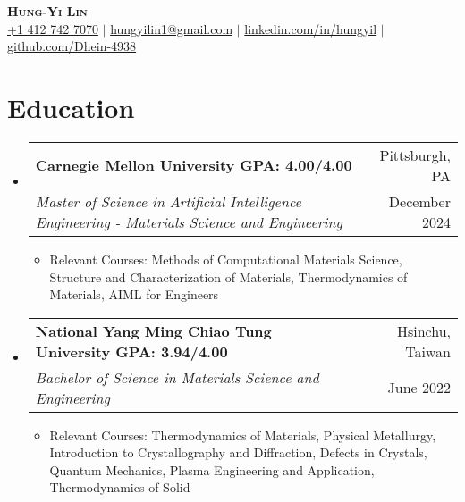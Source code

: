 \documentclass[a4paper,11pt]{article}
\makeatletter
\newcommand{\resumeItem}[1]{
  \item\small{
    {#1 \vspace{-2pt}}
  }
}
\newcommand{\resumeDoubleHeading}[4]{
  \vspace{-2pt}\item
    \begin{tabular*}{0.97\textwidth}[t]{l@{\extracolsep{\fill}}r}
        \textbf{#1} & #2 \\
        \textit{\small#3} & {\small #4} \\
    \end{tabular*}\vspace{-5pt}
}
\newcommand{\resumeSubHeadingListStart}{\begin{itemize}[leftmargin=0.15in, label={}]}
\newcommand{\resumeSubHeadingListEnd}{\end{itemize}}
\makeatother
\begin{document}

\begin{center}
    \textbf{\Huge \scshape Hung-Yi Lin} \\ \vspace{3pt}
    \small
    \faMobile \hspace{.5pt} \href{tel:14127427070}{+1 412 742 7070}
    $|$
    \faAt \hspace{.5pt} \href{mailto:hungyilin1@gmail.com}{hungyilin1@gmail.com}
    $|$
    \faLinkedinSquare \hspace{.5pt} \href{https://www.linkedin.com/in/hungyil}{linkedin.com/in/hungyil}
    $|$
    \faGithub \hspace{.5pt} \href{https://github.com/Dhein-4938}{github.com/Dhein-4938}
\end{center}



\section{Education}
\vspace{3pt}
\resumeSubHeadingListStart
    \resumeDoubleHeading
      {Carnegie Mellon University \textnormal{\small GPA: 4.00/4.00}}{Pittsburgh, PA}
      {Master of Science in Artificial Intelligence Engineering - Materials Science and Engineering}{December 2024}
    \resumeSubHeadingListStart
        \resumeItem{Relevant Courses: Methods of Computational Materials Science, Structure and Characterization of Materials, Thermodynamics of Materials, AIML for Engineers}
    \resumeSubHeadingListEnd
    \resumeDoubleHeading
      {National Yang Ming Chiao Tung University  \textnormal{\small GPA: 3.94/4.00}}{Hsinchu, Taiwan}
      {Bachelor of Science in Materials Science and Engineering}{June 2022}
    \resumeSubHeadingListStart
        \resumeItem{Relevant Courses: Thermodynamics of Materials, Physical Metallurgy, Introduction to Crystallography and Diffraction, Defects in Crystals, Quantum Mechanics, Plasma Engineering and Application, Thermodynamics of Solid}
    \resumeSubHeadingListEnd   
\resumeSubHeadingListEnd

\end{document}
